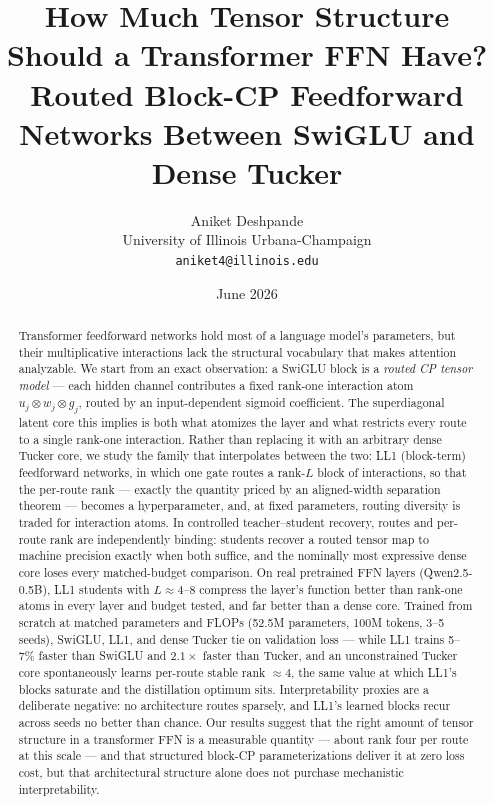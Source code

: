 \documentclass[11pt]{article}
\title{How Much Tensor Structure Should a Transformer FFN Have?\\
\large Routed Block-CP Feedforward Networks Between SwiGLU and Dense Tucker}
\author{Aniket Deshpande\\
University of Illinois Urbana-Champaign\\
\texttt{aniket4@illinois.edu}}
\date{June 2026}
\begin{document}
\maketitle

\begin{abstract}
Transformer feedforward networks hold most of a language model's parameters, but
their multiplicative interactions lack the structural vocabulary that makes attention
analyzable. We start from an exact observation: a SwiGLU block is a \emph{routed CP
tensor model} --- each hidden channel contributes a fixed rank-one interaction atom
$u_j \otimes w_j \otimes g_j$, routed by an input-dependent sigmoid coefficient. The
superdiagonal latent core this implies is both what atomizes the layer and what
restricts every route to a single rank-one interaction. Rather than replacing it with
an arbitrary dense Tucker core, we study the family that interpolates between the
two: LL1 (block-term) feedforward networks, in which one gate routes a rank-$L$ block
of interactions, so that the per-route rank --- exactly the quantity priced by an
aligned-width separation theorem --- becomes a hyperparameter, and, at fixed
parameters, routing diversity is traded for interaction atoms. In controlled
teacher--student recovery, routes and per-route rank are independently binding:
students recover a routed tensor map to machine precision exactly when both suffice,
and the nominally most expressive dense core loses every matched-budget comparison.
On real pretrained FFN layers (Qwen2.5-0.5B), LL1 students with $L\approx4$--$8$
compress the layer's function better than rank-one atoms in every layer and budget
tested, and far better than a dense core. Trained from scratch at matched parameters
and FLOPs (52.5M parameters, 100M tokens, 3--5 seeds), SwiGLU, LL1, and dense
Tucker tie on validation loss --- while LL1 trains 5--7\% faster than SwiGLU and
$2.1\times$ faster than Tucker, and an unconstrained Tucker core spontaneously learns
per-route stable rank $\approx 4$, the same value at which LL1's blocks saturate and
the distillation optimum sits. Interpretability proxies are a deliberate negative:
no architecture routes sparsely, and LL1's learned blocks recur across seeds no
better than chance. Our results suggest that the right amount of tensor structure in
a transformer FFN is a measurable quantity --- about rank four per route at this
scale --- and that structured block-CP parameterizations deliver it at zero loss cost,
but that architectural structure alone does not purchase mechanistic
interpretability.
\end{abstract}
\end{document}
